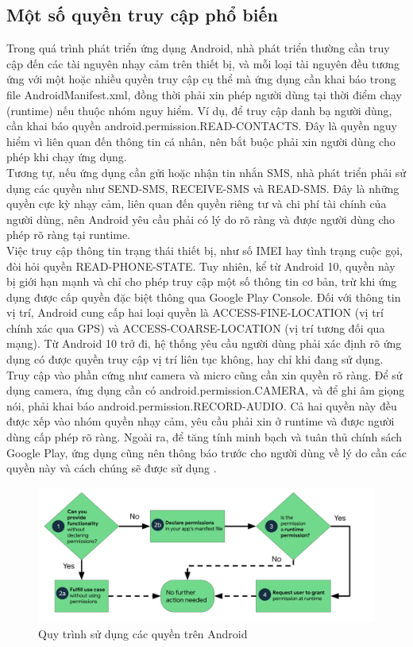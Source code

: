 \subsection{Một số quyền truy cập phổ biến}
        \hspace*{0.8cm}Trong quá trình phát triển ứng dụng Android, nhà phát triển thường cần truy cập đến các tài nguyên nhạy cảm trên thiết bị, và mỗi loại tài nguyên đều tương ứng với một hoặc nhiều quyền truy cập cụ thể mà ứng dụng cần khai báo trong file AndroidManifest.xml, đồng thời phải xin phép người dùng tại thời điểm chạy (runtime) nếu thuộc nhóm nguy hiểm. Ví dụ, để truy cập danh bạ người dùng, cần khai báo quyền android.permission.READ-CONTACTS. Đây là quyền nguy hiểm vì liên quan đến thông tin cá nhân, nên bắt buộc phải xin người dùng cho phép khi chạy ứng dụng.\\
        \hspace*{0.8cm}Tương tự, nếu ứng dụng cần gửi hoặc nhận tin nhắn SMS, nhà phát triển phải sử dụng các quyền như SEND-SMS, RECEIVE-SMS và READ-SMS. Đây là những quyền cực kỳ nhạy cảm, liên quan đến quyền riêng tư và chi phí tài chính của người dùng, nên Android yêu cầu phải có lý do rõ ràng và được người dùng cho phép rõ ràng tại runtime.\\
        \hspace*{0.8cm}Việc truy cập thông tin trạng thái thiết bị, như số IMEI hay tình trạng cuộc gọi, đòi hỏi quyền READ-PHONE-STATE. Tuy nhiên, kể từ Android 10, quyền này bị giới hạn mạnh và chỉ cho phép truy cập một số thông tin cơ bản, trừ khi ứng dụng được cấp quyền đặc biệt thông qua Google Play Console. Đối với thông tin vị trí, Android cung cấp hai loại quyền là ACCESS-FINE-LOCATION (vị trí chính xác qua GPS) và ACCESS-COARSE-LOCATION (vị trí tương đối qua mạng). Từ Android 10 trở đi, hệ thống yêu cầu người dùng phải xác định rõ ứng dụng có được quyền truy cập vị trí liên tục không, hay chỉ khi đang sử dụng.\\
        \hspace*{0.8cm}Truy cập vào phần cứng như camera và micro cũng cần xin quyền rõ ràng. Để sử dụng camera, ứng dụng cần có android.permission.CAMERA, và để ghi âm giọng nói, phải khai báo android.permission.RECORD-AUDIO. Cả hai quyền này đều được xếp vào nhóm quyền nhạy cảm, yêu cầu phải xin ở runtime và được người dùng cấp phép rõ ràng. Ngoài ra, để tăng tính minh bạch và tuân thủ chính sách Google Play, ứng dụng cũng nên thông báo trước cho người dùng về lý do cần các quyền này và cách chúng sẽ được sử dụng \cite{permission}.
    
        \begin{figure}[H] 
            \centering
            \includegraphics[width=1\textwidth]{images/permission.png}
            \caption{Quy trình sử dụng các quyền trên Android}
            \label{fig:android}
        \end{figure} 

